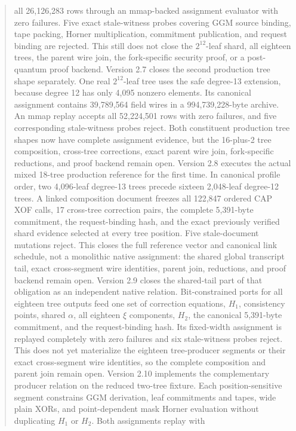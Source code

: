 \documentclass[11pt]{article}
\begin{document}
\begin{abstract}
all 26,126,283 rows through an mmap-backed assignment evaluator with zero
failures.  Five exact stale-witness probes covering GGM source binding, tape
packing, Horner multiplication, commitment publication, and request binding
are rejected.  This still does not close the $2^{12}$-leaf shard, all eighteen
trees, the parent wire join, the fork-specific security proof, or a
post-quantum proof backend.
Version 2.7 closes the second production tree shape separately.  One real
$2^{12}$-leaf tree uses the safe degree-13 extension, because degree 12 has
only 4,095 nonzero elements.  Its canonical assignment contains 39,789,564
field wires in a 994,739,228-byte archive.  An mmap replay accepts all
52,224,501 rows with zero failures, and five corresponding stale-witness
probes reject.  Both constituent production tree shapes now have complete
assignment evidence, but the 16-plus-2 tree composition, cross-tree
corrections, exact parent wire join, fork-specific reductions, and proof
backend remain open.
Version 2.8 executes the actual mixed 18-tree production reference for the
first time.  In canonical profile order, two 4,096-leaf degree-13 trees precede
sixteen 2,048-leaf degree-12 trees.  A linked composition document freezes all
122,847 ordered CAP XOF calls, 17 cross-tree correction pairs, the complete
5,391-byte commitment, the request-binding hash, and the exact previously
verified shard evidence selected at every tree position.  Five stale-document
mutations reject.  This closes the full reference vector and canonical link
schedule, not a monolithic native assignment: the shared global transcript
tail, exact cross-segment wire identities, parent join, reductions, and proof
backend remain open.
Version 2.9 closes the shared-tail part of that obligation as an independent
native relation.  Bit-constrained ports for all eighteen tree outputs feed one
set of correction equations, $H_1$, consistency points, shared $\alpha$, all
eighteen $\xi$ components, $H_2$, the canonical 5,391-byte commitment, and
the request-binding hash.  Its fixed-width assignment is replayed completely
with zero failures and six stale-witness probes reject.  This does not yet
materialize the eighteen tree-producer segments or their exact cross-segment
wire identities, so the complete composition and parent join remain open.
Version 2.10 implements the complementary producer relation on the reduced
two-tree fixture.  Each position-sensitive segment constrains GGM derivation,
leaf commitments and tapes, wide plain XORs, and point-dependent mask Horner
evaluation without duplicating $H_1$ or $H_2$.  Both assignments replay with

\end{abstract}
\end{document}
